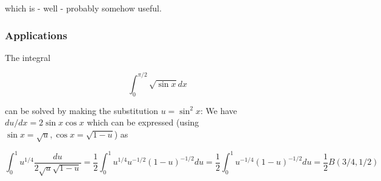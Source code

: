 which is - well - probably somehow useful.

\subsubsection{Applications}

The integral

\[
\int_0^{\pi/2} \sqrt{\sin x} dx
\]

can be solved by making the substitution \(u=\sin^2 x\): We have
\(du/dx = 2 \sin x \cos x\) which can be expressed (using
\(\sin x= \sqrt{u}, \cos x = \sqrt{1-u}\)) as

\[
\int_0^1 u^{1/4} \frac{du}{2\sqrt{u}\sqrt{1-u}} = \frac{1}{2} \int_0^1 u^{1/4} u^{-1/2} (1-u)^{-1/2} du = \frac{1}{2} \int_0^1 u^{-1/4} (1-u)^{-1/2} du = \frac{1}{2} B(3/4,1/2)
\]


